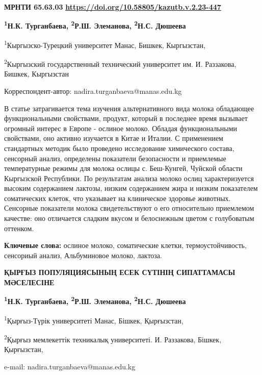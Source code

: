\newpage
{\bfseries МРНТИ 65.63.03}
\hfill {\bfseries \href{https://doi.org/10.58805/kazutb.v.2.23-447}{https://doi.org/10.58805/kazutb.v.2.23-447}}


\begin{center}
{\bfseries \textsuperscript{1}Н.К. Турганбаева, \textsuperscript{2}Р.Ш. Элеманова, \textsuperscript{2}Н.С. Дюшеева}

\textsuperscript{1}Кыргызско-Турецкий университет Манас, Бишкек,
Кыргызстан,

\textsuperscript{2}Кыргызский государственный технический университет
им. И. Раззакова, Бишкек, Кыргызстан

Корреспондент-автор: nadira.turganbaeva@manas.edu.kg
\end{center}

В статье затрагивается тема изучения альтернативного вида молока
обладающее функциональными свойствами, продукт, который в последнее
время вызывает огромный интерес в Eвропе - ослиное молоко. Обладая
функциональными свойствами, оно активно изучается в Китае и Италии. С
применением стандартных методик было проведено исследование химического
состава, сенсорный анализ, определены показатели безопасности и
приемлемые температурные режимы для молока ослицы с. Беш-Кунгей, Чуйской
области Кыргызской Республики. По результатам анализа молоко ослиц
характеризуется высоким содержанием лактозы, низким содержанием жира и
низким показателем соматических клеток, что указывает на клиническое
здоровье животных. Сенсорные показатели молока свидетельствуют о его
относительно приемлемом качестве: оно отличается сладким вкусом и
белоснежным цветом с голубоватым оттенком.

{\bfseries Ключевые слова:} ослиное молоко, соматические клетки,
термоустойчивость, сенсориый анализ, Альбуминовое молоко, лактоза.

\begin{center}
{\large\bfseries ҚЫРҒЫЗ ПОПУЛЯЦИЯСЫНЫҢ ЕСЕК СҮТІНІҢ СИПАТТАМАСЫ МӘСЕЛЕСІНЕ}

{\bfseries \textsuperscript{1}Н.К. Турганбаева, \textsuperscript{2}Р.Ш. Элеманова, \textsuperscript{2}Н.С. Дюшеева}

\textsuperscript{1}Қырғыз-Түрік университеті Манас, Бішкек, Қырғызстан,

\textsuperscript{2}Қырғыз мемлекеттік техникалық университеті. И.
Раззакова, Бішкек, Қырғызстан,

e-mail: nadira.turganbaeva@manas.edu.kg
\end{center}

